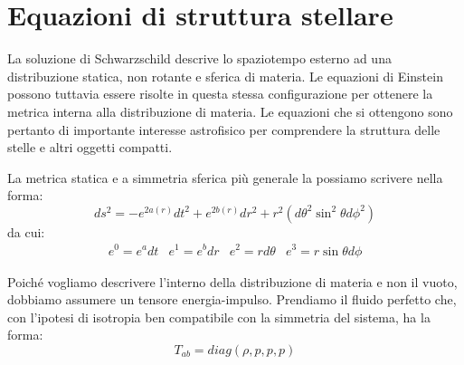 \chapter{Equazioni di struttura stellare}
La soluzione di Schwarzschild descrive lo spaziotempo esterno ad una distribuzione statica, non rotante e sferica di materia. Le equazioni di Einstein possono tuttavia essere risolte in questa stessa configurazione per ottenere la metrica interna alla distribuzione di materia. Le equazioni che si ottengono sono pertanto di importante interesse astrofisico per comprendere la struttura delle stelle e altri oggetti compatti.

La metrica statica e a simmetria sferica più generale la possiamo scrivere nella forma:
\begin{equation}
    ds^2 = -e^{2a(r)}dt^2 + e^{2b(r)}dr^2 + r^2(d\theta^2 \sin^2\theta d\phi^2)
    \label{eq.metrica_statica_generale_exp}
\end{equation}
da cui:
\begin{equation*}
    \begin{array}{cccc}
        e^0 = e^adt & e^1 = e^b dr & e^2 = rd\theta & e^3 = r\sin\theta d\phi
    \end{array}
\end{equation*}

Poiché vogliamo descrivere l'interno della distribuzione di materia e non il vuoto, dobbiamo assumere un tensore energia-impulso. Prendiamo il fluido perfetto che, con l'ipotesi di isotropia ben compatibile con la simmetria del sistema, ha la forma:
\begin{equation*}
    T_{ab} = diag(\rho, p, p, p)
\end{equation*}

